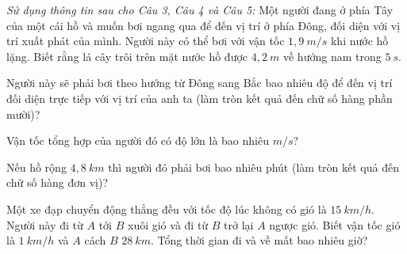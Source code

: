 \textit{Sử dụng thông tin sau cho Câu 3, Câu 4 và Câu 5:} 	Một người đang ở phía Tây của một cái hồ và muốn bơi ngang qua để đến vị trí ở phía Đông, đối diện với vị trí xuất phát của mình. Người này có thể bơi với vận tốc $1,9\ m/s$ khi nước hồ lặng. Biết rằng lá cây trôi trên mặt nước hồ được $4,2\ m$ về hướng nam trong $5\ s$.
\begin{ex}%
Người này sẽ phải bơi theo hướng từ Đông sang Bắc bao nhiêu độ để đến vị trí đối diện trực tiếp với vị trí của anh ta (làm tròn kết quả đến chữ số hàng phần mười)? 
\end{ex}

\begin{ex}
Vận tốc tổng hợp của người đó có độ lớn là bao nhiêu $m/s$?
\end{ex}
\begin{ex}
Nếu hồ rộng $4,8\ km$ thì người đó phải bơi bao nhiêu phút (làm tròn kết quả đến chữ số hàng đơn vị)?
\end{ex}
\begin{ex}%
Một xe đạp chuyển động thẳng đều với tốc độ lúc không có gió là $15\ km/h$. Người này đi từ $A$ tới $B$ xuôi gió và đi từ $B$ trở lại $A$ ngược gió. Biết vận tốc gió là $1\ km/h$ và $A$ cách $B$ $28\ km$. Tổng thời gian đi và về mất bao nhiêu giờ?
\loigiai{
}
\end{ex}







